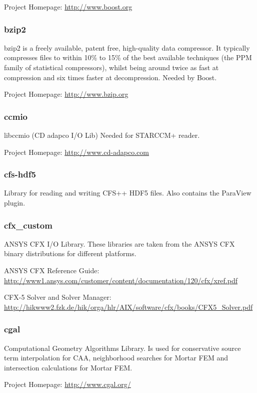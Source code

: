 \noindent Project Homepage: \url{http://www.boost.org}

\subsubsection{bzip2} bzip2  is a freely available,  patent free, high-quality
data compressor. It  typically compresses files to within 10\%  to 15\% of the
best available techniques (the  PPM family of statistical compressors), whilst
being  around  twice   as  fast  at  compression  and   six  times  faster  at
decompression.  Needed by Boost.

\noindent Project Homepage: \url{http://www.bzip.org}

\subsubsection{ccmio} libccmio (CD adapco I/O Lib) Needed for STARCCM+ reader.

\noindent Project Homepage: \url{http://www.cd-adapco.com}

\subsubsection{cfs-hdf5}   Library  for   reading  and   writing   CFS++  HDF5
files. Also contains the ParaView plugin.

\subsubsection{cfx\_custom} ANSYS CFX I/O  Library.  These libraries are taken
from the ANSYS CFX binary distributions for different platforms.

\noindent ANSYS CFX Reference Guide: \url{http://www1.ansys.com/customer/content/documentation/120/cfx/xref.pdf}

\noindent CFX-5 Solver and Solver Manager: \url{http://hikwww2.fzk.de/hik/orga/hlr/AIX/software/cfx/books/CFX5_Solver.pdf}

\subsubsection{cgal}  Computational Geometry Algorithms  Library. Is  used for
conservative  source term  interpolation  for CAA,  neighborhood searches  for
Mortar FEM and intersection calculations for Mortar FEM.

\noindent Project Homepage: \url{http://www.cgal.org/}

